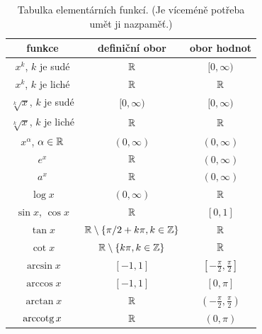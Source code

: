 \begin{table}[H]
    \centering
    \begin{tabular}{|c|c|c|}
        \hline
        funkce & definiční obor & obor hodnot \\
        \hline
        $x^k$, $k$ je sudé              & $\mathbb{R}$          & $[0, \infty)$ \\ 
        $x^k$, $k$ je liché             & $\mathbb{R}$          & $\mathbb{R}$ \\ 
        $\sqrt[k]{x}$, $k$ je sudé      & $[0, \infty)$ & $[0, \infty)$ \\
        $\sqrt[k]{x}$, $k$ je liché     & $\mathbb{R}$          & $\mathbb{R}$ \\
        $x^\alpha$, $\alpha \in \mathbb{R}$     & $(0, \infty)$ & $(0, \infty)$ \\
        $e^x$                           & $\mathbb{R}$          & $(0, \infty)$ \\
        $a^x$                           & $\mathbb{R}$          & $(0, \infty)$ \\
        $\log x$                        & $(0, \infty)$ & $\mathbb{R}$ \\
        $\sin x$, $\cos x$              & $\mathbb{R}$          & $[0,1]$ \\
        $\tan x$                        & $\mathbb{R} \setminus \left \lbrace \pi/2 + k \pi, k \in \mathbb{Z} \right \rbrace$ & $\mathbb{R}$ \\
        $\cot x$                        & $\mathbb{R} \setminus \left \lbrace k \pi, k \in \mathbb{Z} \right \rbrace$  & $\mathbb{R}$ \\
        $\arcsin x$                     & $[-1,1]$      & $[-\frac{\pi}{2}, \frac{\pi}{2}]$ \\
        $\arccos x$                     & $[-1,1]$      & $[0,\pi]$ \\
        $\arctan x$                     & $\mathbb{R}$          & $(-\frac{\pi}{2}, \frac{\pi}{2})$ \\
        $\mathrm{arccotg}\, x$                     & $\mathbb{R}$          & $(0,\pi)$ \\
         \hline
    \end{tabular}
    \caption{Tabulka elementárních funkcí. (Je víceméně potřeba umět ji nazpaměť.)}
    \label{tab:funkce}
\end{table}

